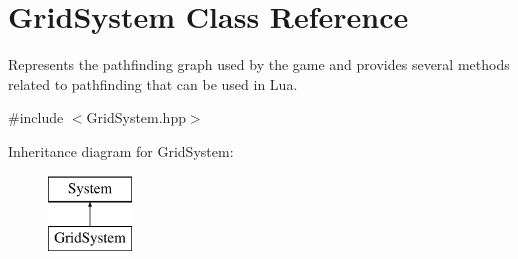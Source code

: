 \hypertarget{class_grid_system}{}\section{Grid\+System Class Reference}
\label{class_grid_system}


Represents the pathfinding graph used by the game and provides several methods related to pathfinding that can be used in Lua.  




{\ttfamily \#include $<$Grid\+System.\+hpp$>$}

Inheritance diagram for Grid\+System\+:\begin{figure}[H]
\begin{center}
\leavevmode
\includegraphics[height=2.000000cm]{class_grid_system}
\end{center}
\end{figure}
